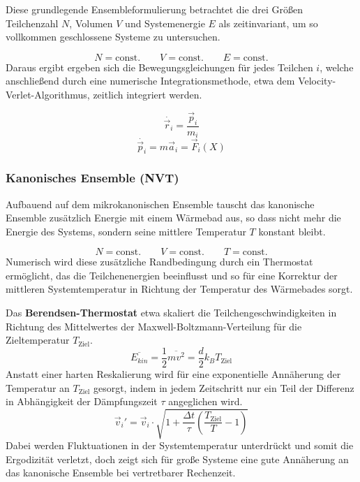 Diese grundlegende Ensembleformulierung betrachtet die drei Größen Teilchenzahl $N$, Volumen $V$ und Systemenergie $E$ als zeitinvariant, um so vollkommen geschlossene Systeme zu untersuchen.

\begin{equation}
  N = \text{const.}
  \qquad
  V = \text{const.}
  \qquad
  E = \text{const.}
\end{equation}
Daraus ergibt ergeben sich die Bewegungsgleichungen für jedes Teilchen $i$, welche anschließend durch eine numerische Integrationsmethode, etwa dem Velocity-Verlet-Algorithmus, zeitlich integriert werden.

\begin{equation}
  \dot{\vec r_i} = \frac{\vec p_i}{m_i}
\end{equation}
\begin{equation}
  \dot{\vec p_i} = m \vec a_i = \vec F_i(X)
\end{equation}

\subsubsection{Kanonisches Ensemble (NVT)}

Aufbauend auf dem mikrokanonischen Ensemble tauscht das kanonische Ensemble zusätzlich Energie mit einem Wärmebad aus, so dass nicht mehr die Energie des Systems, sondern seine mittlere Temperatur $T$ konstant bleibt.

\begin{equation}
  N = \text{const.}
  \qquad
  V = \text{const.}
  \qquad
  T = \text{const.}
\end{equation}
Numerisch wird diese zusätzliche Randbedingung durch ein Thermostat ermöglicht, das die Teilchenenergien beeinflusst und so für eine Korrektur der mittleren Systemtemperatur in Richtung der Temperatur des Wärmebades sorgt.

Das \textbf{Berendsen-Thermostat}\cite{berendsen_molecular_1984} etwa skaliert die Teilchengeschwindigkeiten in Richtung des Mittelwertes der Maxwell-Boltzmann-Verteilung für die Zieltemperatur $T_\text{Ziel}$.
\begin{equation}
  \overline{E_{kin}} = \frac{1}{2} \overline{m v^2} = \frac{d}{2} k_B T_\text{Ziel}
\end{equation}
Anstatt einer harten Reskalierung wird für eine exponentielle Annäherung der Temperatur an $T_\text{Ziel}$ gesorgt, indem in jedem Zeitschritt nur ein Teil der Differenz in Abhängigkeit der Dämpfungszeit $\tau$ angeglichen wird.
\begin{equation}
  \vec v_i' = \vec v_i \cdot \sqrt{1 + \frac{\Delta t}{\tau} \left(\frac{T_\text{Ziel}}{T} - 1\right)}
\end{equation}
Dabei werden Fluktuationen in der Systemtemperatur unterdrückt und somit die Ergodizität verletzt, doch zeigt sich für große Systeme eine gute Annäherung an das kanonische Ensemble bei vertretbarer Rechenzeit.


